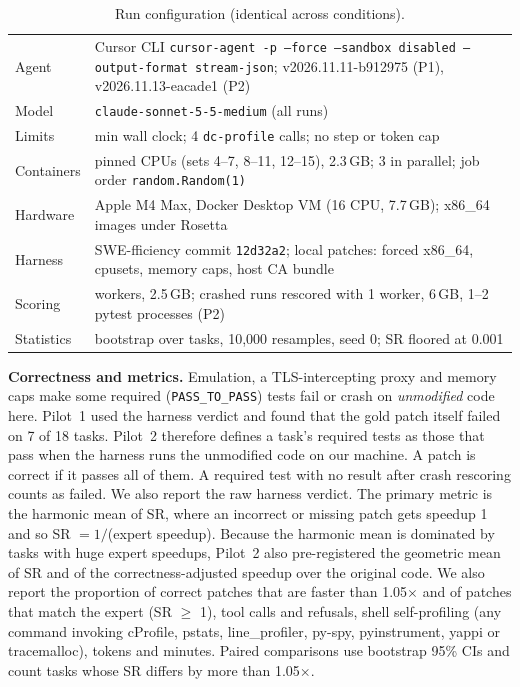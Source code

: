 \documentclass[conference]{IEEEtran}
\newcommand{\tool}{\texttt{dc-profile}}
\begin{document}
\begin{table}[t]
\caption{Run configuration (identical across conditions).}
\label{tab:config}
\centering
\scriptsize
\setlength{\tabcolsep}{2pt}
\begin{tabular}{@{}>{\raggedright\arraybackslash}p{1.9cm}>{\raggedright\arraybackslash}p{6.4cm}@{}}
\toprule
Agent & Cursor CLI \texttt{cursor-agent -p --force --sandbox disabled --output-format stream-json}; v2026.11.11-b912975 (P1), v2026.11.13-eacade1 (P2) \\
Model & \texttt{claude-sonnet-5-5-medium} (all runs) \\
Limits & 30 min wall clock; 4 \tool{} calls; no step or token cap \\
Containers & 4 pinned CPUs (sets 4--7, 8--11, 12--15), 2.3\,GB; 3 in parallel; job order \texttt{random.Random(1)} \\
Hardware & Apple M4 Max, Docker Desktop VM (16 CPU, 7.7\,GB); x86\_64 images under Rosetta \\
Harness & SWE-fficiency commit \texttt{12d32a2}; local patches: forced x86\_64, cpusets, memory caps, host CA bundle \\
Scoring & 3 workers, 2.5\,GB; crashed runs rescored with 1 worker, 6\,GB, 1--2 pytest processes (P2) \\
Statistics & bootstrap over tasks, 10{,}000 resamples, seed 0; SR floored at 0.001 \\
\bottomrule
\end{tabular}
\end{table}

\textbf{Correctness and metrics.} Emulation, a TLS-intercepting proxy and
memory caps make some required (\texttt{PASS\_TO\_PASS}) tests fail or crash on
\emph{unmodified} code here. Pilot~1 used the harness verdict and found that
the gold patch itself failed on 7 of 18 tasks. Pilot~2 therefore defines a
task's required tests as those that pass when the harness runs the unmodified
code on our machine. A patch is correct if it passes all of them. A required
test with no result after crash rescoring counts as failed. We also report
the raw harness verdict. The primary metric is the harmonic mean of SR, where
an incorrect or missing patch gets speedup 1 and so SR $=1/$(expert speedup).
Because the harmonic mean is dominated by tasks with huge expert speedups,
Pilot~2 also pre-registered the geometric mean of SR and of the
correctness-adjusted speedup over the original code. We also report the
proportion of correct patches that are faster than 1.05$\times$ and of
patches that match the expert (SR $\ge$ 1), tool calls and refusals, shell
self-profiling (any command invoking cProfile, pstats, line\_profiler, py-spy,
pyinstrument, yappi or tracemalloc), tokens and minutes. Paired comparisons
use bootstrap 95\% CIs and count tasks whose SR differs by more than
1.05$\times$.
\end{document}
